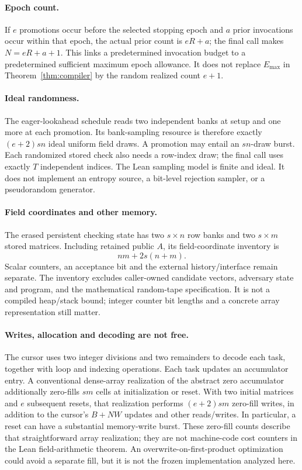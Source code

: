\documentclass[11pt,letterpaper]{article}
\theoremstyle{definition}
\newcommand{\Emax}{E_{\max}}
\begin{document}
\paragraph{Epoch count.}
If $e$ promotions occur before the selected stopping epoch and $a$ prior invocations occur within that epoch, the actual prior count is $eR+a$; the final call makes $N=eR+a+1$. This links a predetermined invocation budget to a predetermined sufficient maximum epoch allowance. It does not replace $\Emax$ in Theorem~\ref{thm:compiler} by the random realized count $e+1$.

\paragraph{Ideal randomness.}
The eager-lookahead schedule reads two independent banks at setup and one more at each promotion. Its bank-sampling resource is therefore exactly $(e+2)sn$ ideal uniform field draws. A promotion may entail an $sn$-draw burst. Each randomized stored check also needs a row-index draw; the final call uses exactly $T$ independent indices. The Lean sampling model is finite and ideal. It does not implement an entropy source, a bit-level rejection sampler, or a pseudorandom generator.

\paragraph{Field coordinates and other memory.}
The erased persistent checking state has two $s\times n$ row banks and two $s\times m$ stored matrices. Including retained public $A$, its field-coordinate inventory is
\begin{equation}
 nm+2s(n+m).\label{eq:storage}
\end{equation}
Scalar counters, an acceptance bit and the external history/interface remain separate. The inventory excludes caller-owned candidate vectors, adversary state and program, and the mathematical random-tape specification. It is not a compiled heap/stack bound; integer counter bit lengths and a concrete array representation still matter.

\paragraph{Writes, allocation and decoding are not free.}
The cursor uses two integer divisions and two remainders to decode each task, together with loop and indexing operations. Each task updates an accumulator entry. A conventional dense-array realization of the abstract zero accumulator additionally zero-fills $sm$ cells at initialization or reset. With two initial matrices and $e$ subsequent resets, that realization performs $(e+2)sm$ zero-fill writes, in addition to the cursor's $B+NW$ updates and other reads/writes. In particular, a reset can have a substantial memory-write burst. These zero-fill counts describe that straightforward array realization; they are not machine-code cost counters in the Lean field-arithmetic theorem. An overwrite-on-first-product optimization could avoid a separate fill, but it is not the frozen implementation analyzed here.
\end{document}

